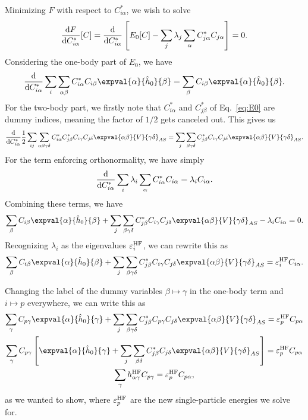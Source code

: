 Minimizing $F$ with respect to $C^*_{i\alpha}$, we wish to solve
\begin{equation*}
    \frac{\mathop{}\!\mathrm{d} F}{\mathop{}\!\mathrm{d} C^*_{i\alpha}}[C] = \frac{\mathop{}\!\mathrm{d}}{\mathop{}\!\mathrm{d} C_{i \alpha}^*} \left[ E_0[C] - \sum_j \lambda_j \sum_{\alpha} C_{j \alpha}^* C_{j \alpha} \right] = 0.
\end{equation*}
Considering the one-body part of $E_0$, we have
\begin{equation*}
    \frac{\diff}{\diff C_{i \alpha}^*} \sum_{i} \sum_{\alpha\beta} C_{i \alpha}^* C_{i \beta}  \expval{\alpha}{\hat{h}_0}{\beta} = \sum_{\beta} C_{i \beta} \expval{\alpha}{\hat{h}_0}{\beta}.
\end{equation*}
For the two-body part, we firstly note that $C_{i \alpha}^*$ and $C_{j \beta}^*$ of Eq.~\eqref{eq:E0} are dummy indices, meaning the factor of $1/2$ gets canceled out.
This gives us
\begin{equation*}
    \frac{\diff}{\diff C_{i \alpha}^*} \frac{1}{2} \sum_{ij} \sum_{\alpha\beta\gamma\delta} C_{i \alpha}^* C_{j \beta}^* C_{i \gamma} C_{j \delta} \expval{\alpha\beta}{V}{\gamma\delta}_{AS} = \sum_j \sum_{\beta\gamma\delta} C_{j \beta}^* C_{i \gamma} C_{j \delta} \expval{\alpha\beta}{V}{\gamma\delta}_{AS}.
\end{equation*}
For the term enforcing orthonormality, we have simply
\begin{equation*}
    \frac{\mathop{}\!\mathrm{d}}{\mathop{}\!\mathrm{d} C_{i \alpha}^*} \sum_{i} \lambda_i \sum_{\alpha} C_{i \alpha}^* C_{i \alpha} = \lambda_i C_{i \alpha}.
\end{equation*}
Combining these terms, we have
\begin{equation*}
    \sum_{\beta} C_{i \beta} \expval{\alpha}{\hat{h}_0}{\beta} + \sum_j \sum_{\beta\gamma\delta} C_{j \beta}^* C_{i \gamma} C_{j \delta} \expval{\alpha\beta}{V}{\gamma\delta}_{AS} - \lambda_i C_{i \alpha} = 0.
\end{equation*}
Recognizing $\lambda_i$ as the eigenvalues $\varepsilon_i^{\mathrm{HF}}$, we can rewrite this as
\begin{equation*}
    \sum_{\beta} C_{i \beta} \expval{\alpha}{\hat{h}_0}{\beta} + \sum_j \sum_{\beta\gamma\delta} C_{j \beta}^* C_{i \gamma} C_{j \delta} \expval{\alpha\beta}{V}{\gamma\delta}_{AS} = \varepsilon_i^\HF C_{i \alpha}.
\end{equation*}

Changing the label of the dummy variables $\beta \mapsto \gamma$ in the one-body term and $i \mapsto p$ everywhere, we can write this as
\begin{gather*}
    \sum_{\gamma} C_{p \gamma} \expval{\alpha}{\hat{h}_0}{\gamma} + \sum_j \sum_{\beta\gamma\delta} C_{j \beta}^* C_{p \gamma} C_{j \delta} \expval{\alpha\beta}{V}{\gamma\delta}_{AS} = \varepsilon_p^\HF C_{p \alpha} \\
    \sum_{\gamma} C_{p \gamma} \left[ \expval{\alpha}{\hat{h}_0}{\gamma} + \sum_j \sum_{\beta\delta} C_{j \beta}^*  C_{j \delta} \expval{\alpha\beta}{V}{\gamma\delta}_{AS} \right] = \varepsilon_p^\HF C_{p \alpha} \\
    \sum_{\gamma} h_{\alpha\gamma}^\HF C_{p \gamma} = \varepsilon_p^\HF C_{p \alpha},
\end{gather*}
as we wanted to show, where $\varepsilon_p^{\mathrm{HF}}$ are the new single-particle energies we solve for.

